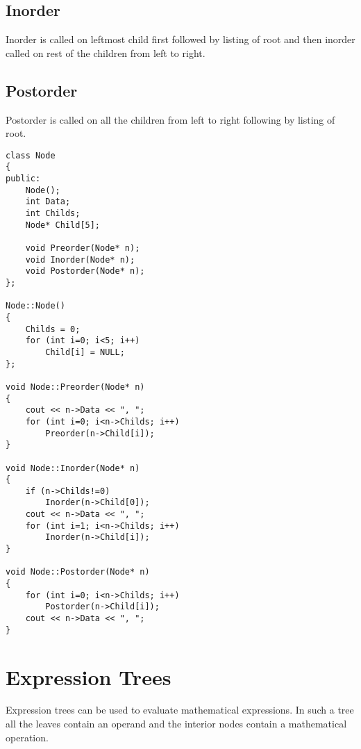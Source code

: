 \documentclass[12pt,a4paper]{article}
\begin{document}
\subsection{Inorder}
Inorder is called on leftmost child first followed by listing of root and then inorder called on rest of the children from left to right.
\subsection{Postorder}
Postorder is called on all the children from left to right following by listing of root.
\begin{lstlisting}[caption={C++ Code for Tree Traversal}]
class Node
{
public:
	Node();
	int Data;
	int Childs;
	Node* Child[5];

	void Preorder(Node* n);
	void Inorder(Node* n);
	void Postorder(Node* n);
};

Node::Node()
{
	Childs = 0;
	for (int i=0; i<5; i++)
		Child[i] = NULL;
};

void Node::Preorder(Node* n)
{
	cout << n->Data << ", ";
	for (int i=0; i<n->Childs; i++)
		Preorder(n->Child[i]);
}

void Node::Inorder(Node* n)
{
	if (n->Childs!=0)
		Inorder(n->Child[0]);
	cout << n->Data << ", ";
	for (int i=1; i<n->Childs; i++)
		Inorder(n->Child[i]);
}

void Node::Postorder(Node* n)
{
	for (int i=0; i<n->Childs; i++)
		Postorder(n->Child[i]);
	cout << n->Data << ", ";
}
\end{lstlisting}
\section{Expression Trees}
Expression trees can be used to evaluate mathematical expressions. In such a tree all the leaves contain an operand and the interior nodes contain a mathematical operation.


\end{document}
